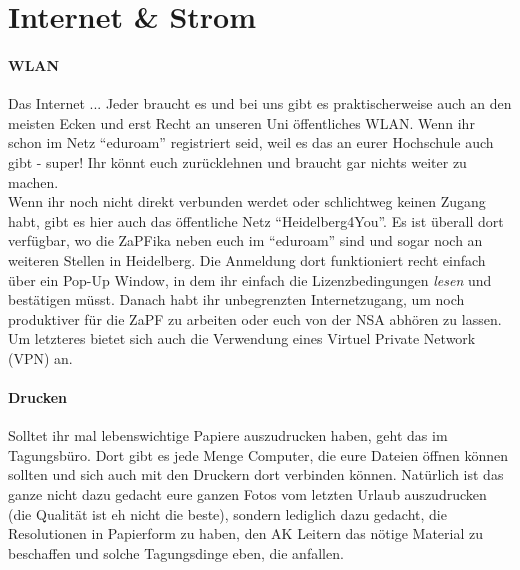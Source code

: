 
\section{Internet \& Strom}
  \paragraph{WLAN}
  Das Internet ... Jeder braucht es und bei uns gibt es praktischerweise auch an den meisten Ecken und erst Recht an unseren Uni
  öffentliches WLAN. Wenn ihr schon im Netz ``eduroam'' registriert seid, weil es das an eurer Hochschule auch gibt - super!
  Ihr könnt euch zurücklehnen und braucht gar nichts weiter zu machen. \\
  Wenn ihr noch nicht direkt verbunden werdet oder schlichtweg keinen Zugang habt, gibt es hier auch das öffentliche Netz ``Heidelberg4You''.
  Es ist überall dort verfügbar, wo die ZaPFika neben euch im ``eduroam'' sind und sogar noch an weiteren Stellen in Heidelberg.
  Die Anmeldung dort funktioniert recht einfach über ein Pop-Up Window, in dem ihr einfach die Lizenzbedingungen \textit{lesen} und bestätigen müsst.
  Danach habt ihr unbegrenzten Internetzugang, um noch produktiver für die ZaPF zu arbeiten oder euch von der NSA abhören zu lassen.
  Um letzteres bietet sich auch die Verwendung eines Virtuel Private Network (VPN) an. \\

  \paragraph{Drucken}
  Solltet ihr mal lebenswichtige Papiere auszudrucken haben, geht das im Tagungsbüro. Dort gibt es jede Menge Computer, die eure Dateien
  öffnen können sollten und sich auch mit den Druckern dort verbinden können.
  Natürlich ist das ganze nicht dazu gedacht eure ganzen Fotos vom letzten Urlaub auszudrucken (die Qualität ist eh nicht die beste),
  sondern lediglich dazu gedacht, die Resolutionen in Papierform zu haben, den AK Leitern das nötige Material zu beschaffen und solche
  Tagungsdinge eben, die anfallen.

